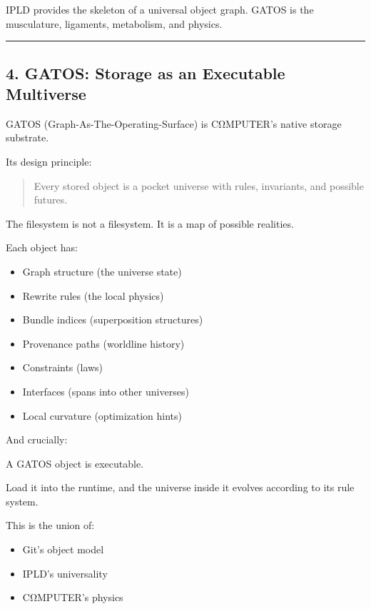 IPLD provides the skeleton of a universal object graph. GATOS is the
musculature, ligaments, metabolism, and physics.

\begin{center}\rule{0.5\linewidth}{0.5pt}\end{center}

\subsection{4. GATOS: Storage as an Executable
Multiverse}\label{gatos-storage-as-an-executable-multiverse}

GATOS (Graph-As-The-Operating-Surface) is CΩMPUTER's native storage
substrate.

Its design principle:

\begin{quote}
Every stored object is a pocket universe with rules, invariants, and
possible futures.
\end{quote}

The filesystem is not a filesystem. It is a map of possible realities.

Each object has:

\begin{itemize}
\tightlist
\item
  Graph structure (the universe state)
\item
  Rewrite rules (the local physics)
\item
  Bundle indices (superposition structures)
\item
  Provenance paths (worldline history)
\item
  Constraints (laws)
\item
  Interfaces (spans into other universes)
\item
  Local curvature (optimization hints)
\end{itemize}

And crucially:

A GATOS object is executable.

Load it into the runtime, and the universe inside it evolves according
to its rule system.

This is the union of:

\begin{itemize}
\tightlist
\item
  Git's object model
\item
  IPLD's universality
\item
  CΩMPUTER's physics
\end{itemize}

